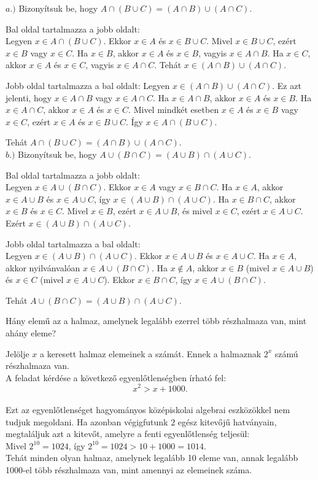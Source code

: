 \begin{solution}
	$a.)$ Bizonyítsuk be, hogy $A\cap(B\cup C)=(A\cap B)\cup(A\cap C)$.
	
	Bal oldal tartalmazza a jobb oldalt: \\
	Legyen $x\in A\cap(B\cup C)$. Ekkor $x\in A$ és $x\in B\cup C$.
	Mivel $x\in B\cup C$, ezért $x\in B$ vagy $x\in C$. Ha $x\in B$,
	akkor $x\in A$ és $x\in B$, vagyis $x\in A\cap B$. Ha $x\in C$,
	akkor $x\in A$ és $x\in C$, vagyis $x\in A\cap C$. Tehát $x\in(A\cap B)\cup(A\cap C)$.
	
	Jobb oldal tartalmazza a bal oldalt: Legyen $x\in(A\cap B)\cup(A\cap C)$.
	Ez azt jelenti, hogy $x\in A\cap B$ vagy $x\in A\cap C$. Ha $x\in A\cap B$,
	akkor $x\in A$ és $x\in B$. Ha $x\in A\cap C$, akkor $x\in A$
	és $x\in C$. Mivel mindkét esetben $x\in A$ és $x\in B$ vagy $x\in C$,
	ezért $x\in A$ és $x\in B\cup C$. Így $x\in A\cap(B\cup C)$.
	
	Tehát $A\cap(B\cup C)=(A\cap B)\cup(A\cap C)$. \\
	$b.)$ Bizonyítsuk be, hogy $A\cup(B\cap C)=(A\cup B)\cap(A\cup C)$.
	
	Bal oldal tartalmazza a jobb oldalt: \\
	Legyen $x\in A\cup(B\cap C)$. Ekkor $x\in A$ vagy $x\in B\cap C$.
	Ha $x\in A$, akkor $x\in A\cup B$ és $x\in A\cup C$, így $x\in(A\cup B)\cap(A\cup C)$.
	Ha $x\in B\cap C$, akkor $x\in B$ és $x\in C$. Mivel $x\in B$,
	ezért $x\in A\cup B$, és mivel $x\in C$, ezért $x\in A\cup C$.
	Ezért $x\in(A\cup B)\cap(A\cup C)$.
	
	Jobb oldal tartalmazza a bal oldalt: \\
	Legyen $x\in(A\cup B)\cap(A\cup C)$. Ekkor $x\in A\cup B$ és $x\in A\cup C$.
	Ha $x\in A$, akkor nyilvánvalóan $x\in A\cup(B\cap C)$. Ha $x\notin A$,
	akkor $x\in B$ (mivel $x\in A\cup B$) és $x\in C$ (mivel $x\in A\cup C$).
	Ekkor $x\in B\cap C$, így $x\in A\cup(B\cap C)$.
	
	Tehát $A\cup(B\cap C)=(A\cup B)\cap(A\cup C)$. 
\end{solution}
\begin{problem}
	Hány elemű az a halmaz, amelynek legalább ezerrel több részhalmaza
	van, mint ahány eleme? 
\end{problem}
\begin{solution}
	Jelölje $x$ a keresett halmaz elemeinek a számát. Ennek a halmaznak
	$2^{x}$ számú részhalmaza van. \\
	A feladat kérdése a következő egyenlőtlenségben írható fel: 
	\[
	x^{2}>x+1000.
	\]
	\\
	Ezt az egyenlőtlenséget hagyományos középiskolai algebrai eszközökkel
	nem tudjuk megoldani. Ha azonban végigfutunk $2$ egész kitevőjű hatványain,
	megtaláljuk azt a kitevőt, amelyre a fenti egyenlőtlenség teljesül:
	\\
	Mivel $2^{10}=1024$, így $2^{10}=1024>10+1000=1014$. \\
	Tehát minden olyan halmaz, amelynek legalább 10 eleme van, annak legalább
	1000-el több részhalmaza van, mint amennyi az elemeinek száma. 
\end{solution}
